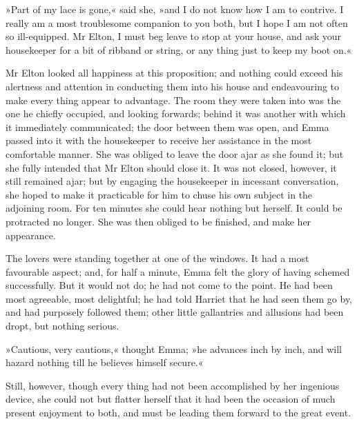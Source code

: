 »Part of my lace is gone,« said she, »and I do not know how I am to contrive. I really am a most troublesome companion to you both, but I hope I am not often so ill-equipped. Mr Elton, I must beg leave to stop at your house, and ask your housekeeper for a bit of ribband or string, or any thing just to keep my boot on.«

Mr Elton looked all happiness at this proposition; and nothing could exceed his alertness and attention in conducting them into his house and endeavouring to make every thing appear to advantage. The room they were taken into was the one he chiefly occupied, and looking forwards; behind it was another with which it immediately communicated; the door between them was open, and Emma passed into it with the housekeeper to receive her assistance in the most comfortable manner. She was obliged to leave the door ajar as she found it; but she fully intended that Mr Elton should close it. It was not closed, however, it still remained ajar; but by engaging the housekeeper in incessant conversation, she hoped to make it practicable for him to chuse his own subject in the adjoining room. For ten minutes she could hear nothing but herself. It could be protracted no longer. She was then obliged to be finished, and make her appearance.

The lovers were standing together at one of the windows. It had a most favourable aspect; and, for half a minute, Emma felt the glory of having schemed successfully. But it would not do; he had not come to the point. He had been most agreeable, most delightful; he had told Harriet that he had seen them go by, and had purposely followed them; other little gallantries and allusions had been dropt, but nothing serious.

»Cautious, very cautious,« thought Emma; »he advances inch by inch, and will hazard nothing till he believes himself secure.«

Still, however, though every thing had not been accomplished by her ingenious device, she could not but flatter herself that it had been the occasion of much present enjoyment to both, and must be leading them forward to the great event.